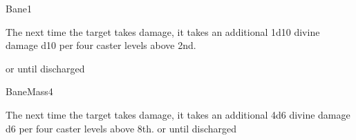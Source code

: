 \begin{spellsection}{Bane}{1}
\begin{spellheader}
\end{spellheader}
\begin{spellcontent}
    \begin{spelltargetinginfo}
    \end{spelltargetinginfo}
    \begin{spelleffects}
        \spelleffect The next time the target takes damage, it takes an additional 1d10 divine damage \add d10 per four caster levels above 2nd.

        \spelldur \durshort or until discharged \dismissable
    \end{spelleffects}
\end{spellcontent}
\begin{spellfooter}
\end{spellfooter}
\end{spellsection}

\begin{spellsection}{Bane}{Mass}{4}
\begin{spellheader}
\end{spellheader}
\begin{spellcontent}
    \begin{spelltargetinginfo}
    \end{spelltargetinginfo}
    \begin{spelleffects}
        \spelleffect The next time the target takes damage, it takes an additional 4d6 divine damage \add d6 per four caster levels above 8th.
        \spelldur \durshort or until discharged \dismissable
    \end{spelleffects}
\end{spellcontent}
\begin{spellfooter}
\end{spellfooter}
\end{spellsection}

